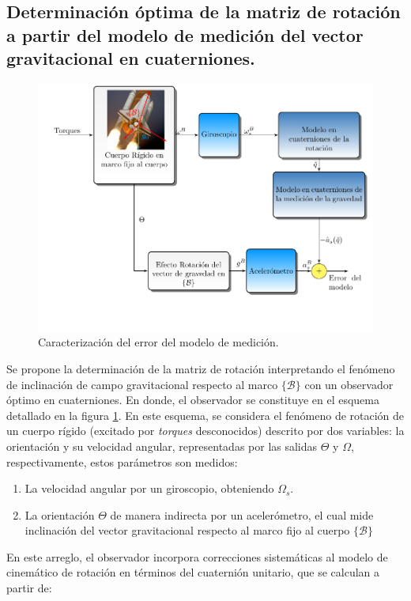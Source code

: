 \documentclass[conference]{IEEEtran}
\newcommand{\marco}[1]{\{\mathcal{#1}\}}
\begin{document}
\subsection{Determinación óptima de la matriz de rotación a partir del modelo de medición del vector gravitacional en cuaterniones.}
\begin{figure} [t]
\begin{center}
\includegraphics[scale=0.50,viewport=20 50 430 330,clip]{ObsOptimo_fig3.pdf}
\caption{Caracterización del error del modelo de medición.}
\label{ObsOptimo_fig2}
\end{center}
\end{figure}
Se propone la determinación de la matriz de rotación interpretando el fenómeno de inclinación de campo gravitacional respecto al marco $\marco{B}$ con un observador óptimo en cuaterniones. En donde, el observador se constituye en el esquema detallado en la figura \ref{ObsOptimo_fig2}. En este esquema, se considera el fenómeno de rotación de un cuerpo rígido (excitado por \emph{torques} desconocidos) descrito por dos variables: la orientación y su velocidad angular, representadas por las salidas $\Theta$ y $\Omega$, respectivamente, estos parámetros son medidos:
\begin{enumerate} 
\item La velocidad angular por un giroscopio, obteniendo $\Omega_s$.
\item La orientación $\Theta$ de manera indirecta por un acelerómetro, el cual mide inclinación del vector gravitacional respecto al marco fijo al cuerpo $\marco{B}$
\end{enumerate}
En este arreglo, el observador incorpora correcciones sistemáticas al modelo de cinemático de rotación en términos del cuaternión unitario, que se calculan a partir de:
\end{document}
